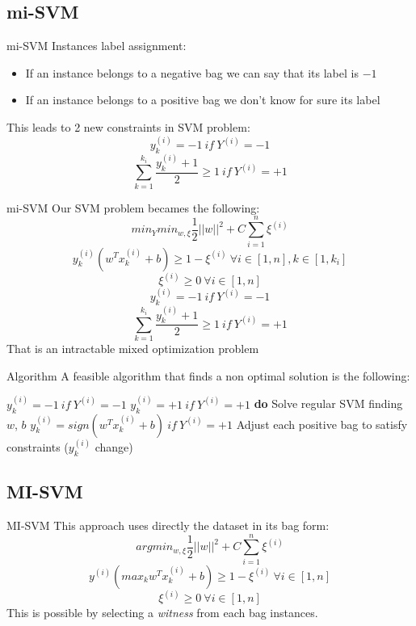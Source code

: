 \subsection{mi-SVM}
\begin{frame}{mi-SVM}
	Instances label assignment:
	\begin{itemize}\setlength\itemsep{1em}
		\item If an instance belongs to a negative bag we can say that its label is $-1$
		\item If an instance belongs to a positive bag we don't know for sure its label
	\end{itemize}
	\vspace{12px}
	This leads to 2 new constraints in SVM problem:
	$$y_k^{(i)} = -1 \ if \ Y^{(i)} = -1$$
	$$\sum_{k = 1}^{k_i}\frac{y_k^{(i)} + 1}{2} \geq 1 \ if \ Y^{(i)} = +1$$
\end{frame}

\begin{frame}{mi-SVM}
	Our SVM problem becames the following:
	$$min_Y min_{w, \xi} \frac{1}{2} ||w||^2 + C \sum_{i = 1}^{n}\xi^{(i)}$$
	$$y_k^{(i)} (w^T x_k^{(i)} + b) \geq 1 - \xi^{(i)} \ \forall i \in [1, n], k \in [1, k_i]$$
	$$\xi^{(i)} \geq 0 \ \forall i \in [1, n]$$
	$$y_k^{(i)} = -1 \ if \ Y^{(i)} = -1$$
	$$\sum_{k = 1}^{k_i}\frac{y_k^{(i)} + 1}{2} \geq 1 \ if \ Y^{(i)} = +1$$
	That is an intractable mixed optimization problem
\end{frame}

\begin{frame}{Algorithm}
	A feasible algorithm that finds a non optimal solution is the following:
	
	\begin{codebox}
		\li $y_k^{(i)} = -1 \ if \ Y^{(i)} = -1$
		\li $y_k^{(i)} = +1 \ if \ Y^{(i)} = +1$
		\li \textbf{do} \Do
		\li Solve regular SVM finding $w$, $b$
		\li $y_k^{(i)} = sign(w^T x_k^{(i)} + b) \ if \ Y^{(i)} = +1$
		\li Adjust each positive bag to satisfy constraints \End
		\li \While($y_k^{(i)}$ change)
		
	\end{codebox}
	
\end{frame}

\subsection{MI-SVM}
\begin{frame}{MI-SVM}
	This approach uses directly the dataset in its bag form:
	$$arg min_{w, \xi} \frac{1}{2} ||w||^2 + C \sum_{i = 1}^{n}\xi^{(i)}$$
	$$y^{(i)} (max_k w^T x_k^{(i)} + b) \geq 1 - \xi^{(i)} \ \forall i \in [1, n]$$
	$$\xi^{(i)} \geq 0 \ \forall i \in [1, n]$$
	This is possible by selecting a \textit{witness} from each bag instances.
\end{frame}


